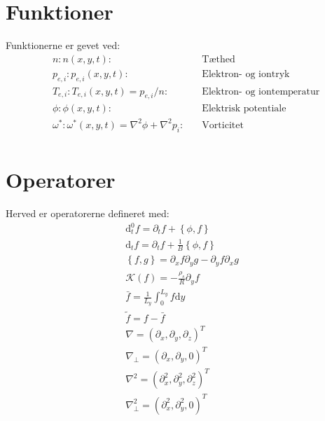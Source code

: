 \documentclass{article}
\begin{document}
\section{Funktioner}
Funktionerne er gevet ved:
\begin{align*}
    &n: n(x,y,t): &\text{Tæthed} \\
    &p_{e,i}: p_{e,i}(x,y,t): &\text{Elektron- og iontryk}  \\
    &T_{e,i}: T_{e,i}(x,y,t) = p_{e,i}/n: \quad &\text{Elektron- og iontemperatur} \\
    &\phi: \phi(x,y,t): \quad &\text{Elektrisk potentiale} \\
    &\omega^*: \omega^*(x,y,t) = \nabla^2\phi + \nabla^2 p_i: \quad &\text{Vorticitet} \\
\end{align*}


\section{Operatorer}
Herved er operatorerne defineret med:
\begin{gather*}
    \mathrm{d}_t^0 f = \partial_t f + \left\{\phi, f \right\}\\
    \mathrm{d}_t f = \partial_t f  + \frac{1}{B}  \left\{ \phi , f \right\} \\    
    \left\{ f, g\right\} = \partial_x f \partial_y g - \partial_y f \partial_x g\\
    \mathcal{K}(f)= - \frac{\rho_s}{R}\partial_y f \\
    \bar f = \frac{1}{L_y}\int_0^{L_y} f \mathrm{d}y\\
    \tilde f = f - \bar f\\
    \nabla = \left(\partial_x, \partial_y, \partial_z \right)^T\\
    \nabla_\perp = \left(\partial_x, \partial_y, 0 \right)^T\\
    \nabla^2 = \left(\partial^2_x, \partial^2_y, \partial^2_z \right)^T\\
    \nabla_\perp^2 = \left(\partial^2_x, \partial^2_y, 0 \right)^T\\
\end{gather*}
\end{document}
